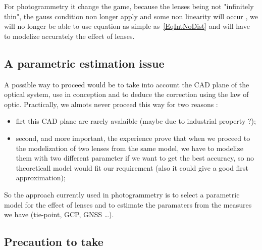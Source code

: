 For photogrammetry it change the game, because the lenses being not "infinitely thin", the gauss
condition non longer apply and some non linearity will occur , we will no longer be able to use
equation as simple as~\ref{EqIntNoDist} and will have to modelize accurately the effect of
lenses. 


\subsection{A parametric estimation issue}

A possible way to proceed would be to take into account the CAD plane of the optical
system, use in conception and to deduce the correction using the law of optic.  
Practically, we almots never proceed this way for two reasons  :

\begin{itemize}
   \item firt this CAD plane are rarely avalaible (maybe due to industrial property ?);
   \item second, and more important, the experience prove that when we proceed to the
         modelization of two lenses from the same model, we have to modelize them with two
         different parameter if we want to get the best accuracy, so no theoreticall model 
         would fit our requirement (also it could give a good first approximation);
\end{itemize}

So the approach currently used in photogrammetry is to select a parametric model
for the effect of lenses and to estimate the paramaters from the measures we have  (tie-point,
GCP, GNSS  \dots).


\subsection{Precaution to take}
\label{ParamFit}

